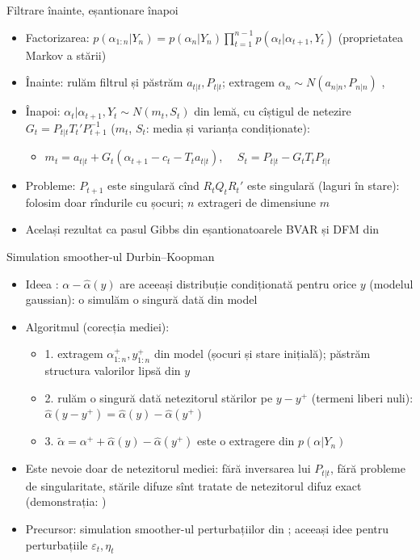 \begin{frame}{Filtrare înainte, eșantionare înapoi}
\itemsize{\small}
\begin{itemize}
    \item Factorizarea: $p(\alpha_{1:n} | Y_n) = p(\alpha_n | Y_n)\prod_{t=1}^{n-1}p(\alpha_t | \alpha_{t+1}, Y_t)$ (proprietatea Markov a stării)
    \item Înainte: rulăm filtrul și păstrăm $a_{t|t}, P_{t|t}$; extragem $\alpha_n \sim N(a_{n|n}, P_{n|n})$ , 
    \item Înapoi: $\alpha_t | \alpha_{t+1}, Y_t \sim N(m_t, S_t)$ din lemă, cu cîștigul de netezire $G_t = P_{t|t}T_t'P_{t+1}^{-1}$ ($m_t$, $S_t$: media și varianța condiționate):
    \begin{itemize}
        \item $m_t = a_{t|t} + G_t(\alpha_{t+1} - c_t - T_ta_{t|t})$, $\quad S_t = P_{t|t} - G_tT_tP_{t|t}$
    \end{itemize}
    \item Probleme: $P_{t+1}$ este singulară cînd $R_tQ_tR_t'$ este singulară (laguri în stare): folosim doar rîndurile cu șocuri; $n$ extrageri de dimensiune $m$
    \item Același rezultat ca pasul Gibbs din eșantionatoarele BVAR și DFM din 
\end{itemize}
\end{frame}

\begin{frame}{Simulation smoother-ul Durbin--Koopman}
\itemsize{\small}
\begin{itemize}
    \item Ideea : $\alpha - \hat\alpha(y)$ are aceeași distribuție condiționată pentru orice $y$ (modelul gaussian): o simulăm o singură dată din model
    \item Algoritmul (corecția mediei):
    \begin{itemize}
        \item 1. extragem $\alpha^+_{1:n}, y^+_{1:n}$ din model (șocuri și stare inițială); păstrăm structura valorilor lipsă din $y$
        \item 2. rulăm o singură dată netezitorul stărilor pe $y - y^+$ (termeni liberi nuli): $\hat\alpha(y - y^+) = \hat\alpha(y) - \hat\alpha(y^+)$
        \item 3. $\tilde\alpha = \alpha^+ + \hat\alpha(y) - \hat\alpha(y^+)$ este o extragere din $p(\alpha | Y_n)$
    \end{itemize}
    \item Este nevoie doar de netezitorul mediei: fără inversarea lui $P_{t|t}$, fără probleme de singularitate, stările difuze sînt tratate de netezitorul difuz exact (demonstrația: )  %
    \item Precursor: simulation smoother-ul perturbațiilor din ; aceeași idee pentru perturbațiile $\varepsilon_t, \eta_t$
\end{itemize}
\end{frame}

